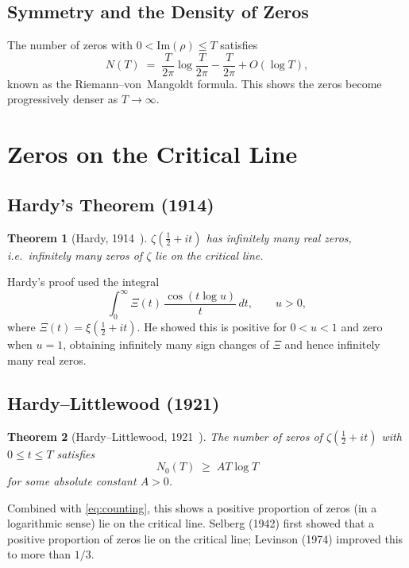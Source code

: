 \documentclass[12pt,a4paper]{article}
\newtheorem{theorem}{Theorem}[section]
\theoremstyle{remark}
\begin{document}
\subsection{Symmetry and the Density of Zeros}

The number of zeros with $0 < \mathrm{Im}(\rho) \leq T$ satisfies
\begin{equation}\label{eq:counting}
  N(T) \;=\; \frac{T}{2\pi}\log\frac{T}{2\pi} - \frac{T}{2\pi} + O(\log T),
\end{equation}
known as the Riemann--von~Mangoldt formula.  This shows the zeros become progressively
denser as $T\to\infty$.

\section{Zeros on the Critical Line}

\subsection{Hardy's Theorem (1914)}

\begin{theorem}[Hardy, 1914~\cite{Hardy1914}]
  $\zeta(\tfrac{1}{2}+it)$ has infinitely many real zeros, i.e.\ infinitely many
  zeros of $\zeta$ lie on the critical line.
\end{theorem}

Hardy's proof used the integral
\[
  \int_0^\infty \Xi(t)\,\frac{\cos(t\log u)}{t}\,dt, \qquad u > 0,
\]
where $\Xi(t) = \xi(\tfrac{1}{2}+it)$.  He showed this is positive for $0 < u < 1$ and
zero when $u=1$, obtaining infinitely many sign changes of $\Xi$ and hence infinitely many
real zeros.

\subsection{Hardy--Littlewood (1921)}

\begin{theorem}[Hardy--Littlewood, 1921~\cite{HardyLittlewood1921}]
  The number of zeros of $\zeta(\tfrac{1}{2}+it)$ with $0 \leq t \leq T$ satisfies
  \[
    N_0(T) \;\geq\; AT\log T
  \]
  for some absolute constant $A > 0$.
\end{theorem}

Combined with \eqref{eq:counting}, this shows a positive proportion of zeros (in a
logarithmic sense) lie on the critical line. Selberg (1942) first showed that a positive
proportion of zeros lie on the critical line; Levinson (1974) improved this to more than $1/3$.
\end{document}
